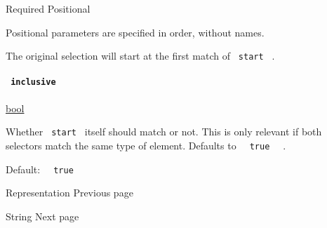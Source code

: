 {Required} {{ Positional }}

\label{definitions-after-start-positional-tooltip}
Positional parameters are specified in order, without names.

The original selection will start at the first match of
\texttt{\ start\ } .

\paragraph{\texorpdfstring{\texttt{\ inclusive\ }}{ inclusive }}\label{definitions-after-inclusive}

\href{/docs/reference/foundations/bool/}{bool}

Whether \texttt{\ start\ } itself should match or not. This is only
relevant if both selectors match the same type of element. Defaults to
\texttt{\ }{\texttt{\ true\ }}\texttt{\ } .

Default: \texttt{\ }{\texttt{\ true\ }}\texttt{\ }

\href{/docs/reference/foundations/repr/}{\pandocbounded{}}

{ Representation } { Previous page }

\href{/docs/reference/foundations/str/}{\pandocbounded{}}

{ String } { Next page }
